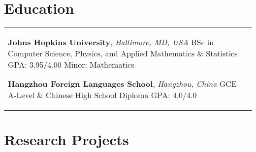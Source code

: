 \documentclass[10pt]{article} %
\begin{document}
\section{Education} 





\begin{supertabular}{L{4cm}@{\hskip 0.3in}L{13cm}} %

	
	
	
	{\textbf{Johns Hopkins University}, \textit{Baltimore, MD, USA}} %
	{BSc in Computer Science, Physics, and Applied Mathematics \& Statistics} %
	{GPA: 3.95/4.00} %
	{Minor: Mathematics} %
	
	
	{\textbf{Hangzhou Foreign Languages School}, \textit{Hangzhou, China}} %
	{GCE A-Level \& Chinese High School Diploma}
        {GPA: 4.0/4.0}
        { }	 

\end{supertabular}
\vspace{-0.3cm}

\section{Research Projects}
\end{document}
